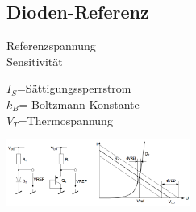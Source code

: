         \subsection{Dioden-Referenz}
            \begin{minipage}[T]{8.5cm}
                Referenzspannung
                \hspace{14mm}\\
                Sensitivit\"at
                \hspace{24.2mm}
            \end{minipage}
            \begin{minipage}{4.5cm}
                $I_S$=S\"attigungssperrstrom\\
                $k_B$= Boltzmann-Konstante\\
                $V_T$=Thermospannung
            \end{minipage}
            \begin{minipage}{6cm}
                \includegraphics[width=6cm]{./bilder/DiodenRef.png}\\
            \end{minipage}\\
            
